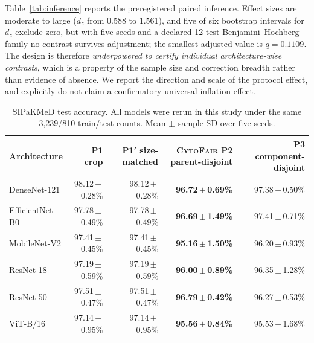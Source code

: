 \documentclass[conference]{IEEEtran}
\newcommand{\meanpm}[2]{#1\,$\pm$\,#2}
\newcommand{\protocol}[1]{\textsf{#1}}
\newcommand{\cytofair}{\textsc{CytoFair}}
\begin{document}
Table~\ref{tab:inference} reports the preregistered paired inference.
Effect sizes are moderate to large ($d_z$ from 0.588 to 1.561), and five of six bootstrap intervals for $d_z$ exclude zero, but with five seeds and a declared 12-test Benjamini--Hochberg family no contrast survives adjustment; the smallest adjusted value is $q=0.1109$.
The design is therefore \emph{underpowered to certify individual architecture-wise contrasts}, which is a property of the sample size and correction breadth rather than evidence of absence.
We report the direction and scale of the protocol effect, and explicitly do not claim a confirmatory universal inflation effect.

\begin{table}[t]
\caption{SIPaKMeD test accuracy. All models were rerun in this study under the same 3,239/810 train/test counts. Mean $\pm$ sample SD over five seeds.}
\label{tab:classification}
\centering
\scriptsize
\setlength{\tabcolsep}{7pt}
\begin{tabular}{lrrrr}
\toprule
Architecture & \protocol{P1} crop & \protocol{P1$'$} size-matched & \textbf{\cytofair{} \protocol{P2} parent-disjoint} & \protocol{P3} component-disjoint \\
\midrule
DenseNet-121 & \meanpm{98.12}{0.28}\% & \meanpm{98.12}{0.28}\% & \textbf{\meanpm{96.72}{0.69}\%} & \meanpm{97.38}{0.50}\% \\
EfficientNet-B0 & \meanpm{97.78}{0.49}\% & \meanpm{97.78}{0.49}\% & \textbf{\meanpm{96.69}{1.49}\%} & \meanpm{97.41}{0.71}\% \\
MobileNet-V2 & \meanpm{97.41}{0.45}\% & \meanpm{97.41}{0.45}\% & \textbf{\meanpm{95.16}{1.50}\%} & \meanpm{96.20}{0.93}\% \\
ResNet-18 & \meanpm{97.19}{0.59}\% & \meanpm{97.19}{0.59}\% & \textbf{\meanpm{96.00}{0.89}\%} & \meanpm{96.35}{1.28}\% \\
ResNet-50 & \meanpm{97.51}{0.47}\% & \meanpm{97.51}{0.47}\% & \textbf{\meanpm{96.79}{0.42}\%} & \meanpm{96.27}{0.53}\% \\
ViT-B/16 & \meanpm{97.14}{0.95}\% & \meanpm{97.14}{0.95}\% & \textbf{\meanpm{95.56}{0.84}\%} & \meanpm{95.53}{1.68}\% \\
\bottomrule
\end{tabular}
\end{table}
\end{document}
